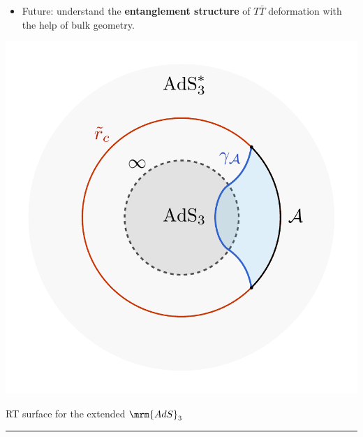 \documentclass[10pt]{article}
\newcommand{\citations}[1]{{\footnotesize#1\par}}
\newcommand{\TTbar}{\texorpdfstring{\ensuremath{T\bar{T}}}{TTbar}\xspace}
\begin{document}
\begin{multicols}{3}
\begin{itemize}
	\item Future: understand the \textbf{entanglement structure} of \TTbar deformation with the help of bulk geometry.
	\begin{flushright}
		\vspace{-.5\baselineskip}
		\citations{
			\textcite{Lewkowycz:2019xse}
		}
	\end{flushright}
\end{itemize}
\centering\vspace{-1\baselineskip}
\includegraphics[width=.6\linewidth]{img/RT-AdS.pdf}

\vspace{-1\baselineskip}
{\footnotesize RT surface for the extended $\mrm{AdS}_3$}

\vspace{.8\baselineskip}
\hrule
\vspace{.1\baselineskip}


\end{multicols}
\end{document}
